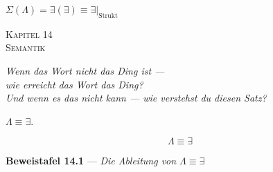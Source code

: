 \documentclass[10pt, openany, oneside]{book}
\renewcommand{\large}{\fontsize{11.5}{14}\selectfont}
\renewcommand{\huge}{\fontsize{17}{21}\selectfont}
\begin{document}
\vspace{0.5em}

\begin{center}
    $\Sigma(\Lambda) = \exists(\exists) \equiv \exists|_{\text{Strukt}}$
\end{center}

%
%
%
%

\newpage

\begin{center}
    {\huge\scshape Kapitel 14}\\[0.3em]
    {\large\scshape Semantik}
\end{center}

\vspace{1.5em}

\begin{center}
    \itshape
    Wenn das Wort nicht das Ding ist ---\\
    wie erreicht das Wort das Ding?\\
    Und wenn es das nicht kann --- wie verstehst du diesen Satz?
\end{center}

\vspace{2em}


\noindent $\Lambda \equiv \exists$.

$$\boxed{\Lambda \equiv \exists}$$

\vspace{0.5em}

\textbf{Beweistafel 14.1} --- \textit{Die Ableitung von $\Lambda \equiv \exists$}

\vspace{0.5em}
\end{document}
